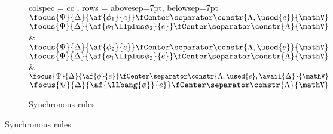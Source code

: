 \begin{figure}[H]
	\ContinuedFloat
	\begin{subfigure}{\textwidth}
		\centering
		\begin{tblr}{ colspec = { cc } 
			    , rows = {abovesep=7pt, belowsep=7pt}
			    }
			 {\footnotesize
			\LeftLabel{$[\llten]$}
			\DP}
			\\ 
			{\footnotesize
			\AX$\focus{\Psi}{\Delta}{\af{\phi_1}{e}} \fCenter \separator \constr{\Lambda, \used{e}}{\mathV}$
			\LeftLabel{$[\llplus_L]$}
			\UI$\focus{\Psi}{\Delta}{\af{\phi_1 \llplus \phi_2}{e}} \fCenter \separator \constr{\Lambda}{\mathV}$
			\DP}
			&
			{\footnotesize
			\AX$\focus{\Psi}{\Delta}{\af{\phi_2}{e}} \fCenter \separator \constr{\Lambda, \used{e}}{\mathV}$
			\LeftLabel{$[\llplus_R]$}
			\UI$\focus{\Psi}{\Delta}{\af{\phi_1 \llplus \phi_2}{e}} \fCenter \separator \constr{\Lambda}{\mathV}$
			\DP}
			\\
			{\footnotesize
			\LeftLabel{$[1]$}
			\DP} 
			&
			{\footnotesize
			\AX$\focus{\Psi}{\Delta}{\af{\phi}{e}} \fCenter \separator \constr{\Lambda, \used{e}, \avail{\Delta}}{\mathV}$
			\LeftLabel{$[\,!\,]$}
			\UI$\focus{\Psi}{\Delta}{\af{\llbang{\phi}}{e}} \fCenter \separator \constr{\Lambda}{\mathV}$
			\DP
			}
			\\
			 {\footnotesize
			\LeftLabel{$[R\!\Downarrow]$}
			\DP
			}
		\end{tblr}
		\caption{Synchronous rules}
	\end{subfigure}
\end{figure}

